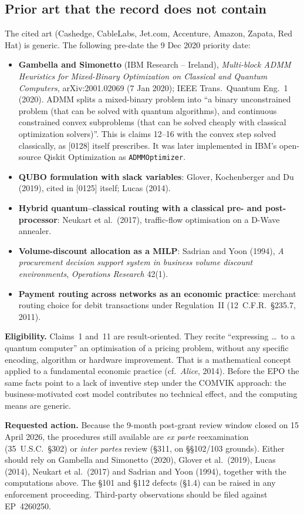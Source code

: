 \documentclass[10pt,a4paper]{article}
\newcommand{\act}[1]{\noindent\textbf{Requested action.} #1\par}
\begin{document}
\subsection{Prior art that the record does not contain}
The cited art (Cashedge, CableLabs, Jet.com, Accenture, Amazon, Zapata, Red Hat) is generic. The following pre-date the 9 Dec 2020 priority date:
\begin{itemize}
  \item \textbf{Gambella and Simonetto} (IBM Research -- Ireland), \emph{Multi-block ADMM Heuristics for Mixed-Binary Optimization on Classical and Quantum Computers}, arXiv:2001.02069 (7 Jan 2020); IEEE Trans.\ Quantum Eng.\ 1 (2020). ADMM splits a mixed-binary problem into ``a binary unconstrained problem (that can be solved with quantum algorithms), and continuous constrained convex subproblems (that can be solved cheaply with classical optimization solvers)''. This is claims 12--16 with the convex step solved classically, as [0128] itself prescribes. It was later implemented in IBM's open-source Qiskit Optimization as \texttt{ADMMOptimizer}.
  \item \textbf{QUBO formulation with slack variables}: Glover, Kochenberger and Du (2019), cited in [0125] itself; Lucas (2014).
  \item \textbf{Hybrid quantum--classical routing with a classical pre- and post-processor}: Neukart et al.\ (2017), traffic-flow optimisation on a D-Wave annealer.
  \item \textbf{Volume-discount allocation as a MILP}: Sadrian and Yoon (1994), \emph{A procurement decision support system in business volume discount environments}, \emph{Operations Research} 42(1).
  \item \textbf{Payment routing across networks as an economic practice}: merchant routing choice for debit transactions under Regulation~II (12~C.F.R.~\S235.7, 2011).
\end{itemize}
\noindent\textbf{Eligibility.} Claims~1 and~11 are result-oriented. They recite ``expressing \ldots\ to a quantum computer'' an optimisation of a pricing problem, without any specific encoding, algorithm or hardware improvement. That is a mathematical concept applied to a fundamental economic practice (cf.\ \emph{Alice}, 2014). Before the EPO the same facts point to a lack of inventive step under the COMVIK approach: the business-motivated cost model contributes no technical effect, and the computing means are generic.

\act{Because the 9-month post-grant review window closed on 15 April 2026, the procedures still available are \emph{ex parte} reexamination (35~U.S.C.~\S302) or \emph{inter partes} review (\S311, on \S\S102/103 grounds). Either should rely on Gambella and Simonetto (2020), Glover et al.\ (2019), Lucas (2014), Neukart et al.\ (2017) and Sadrian and Yoon (1994), together with the computations above. The \S101 and \S112 defects (\S1.4) can be raised in any enforcement proceeding. Third-party observations should be filed against EP~4260250.}
\end{document}
